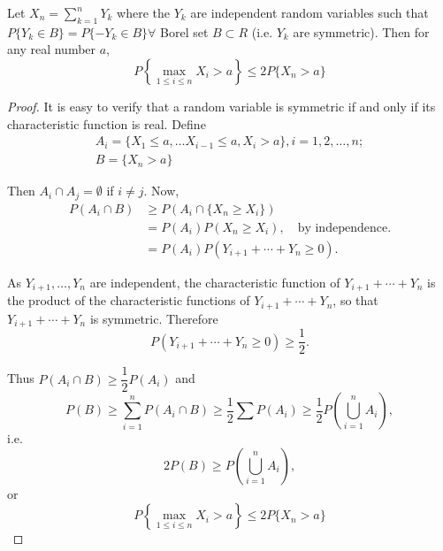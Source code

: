 \setcounter{lemma}{0}
\begin{lemma}\label{chap7-lem1}
Let $X_{n}=\sum\limits^{n}_{k=1}Y_{k}$ where the $Y_{k}$ are
independent random variables such that $P\{Y_{k}\in B\}=P\{-Y_{k}\in
B\}\forall$ Borel set $B\subset R$ (i.e. $Y_{k}$ are symmetric). Then
for any real number $a$,
$$
P\left\{\max\limits_{1\leq i\leq n} X_{i}>a\right\}\leq 2P\{X_{n}>a\}
$$
\end{lemma}

\begin{proof}
It is easy to verify that a random variable is symmetric if and only
if its characteristic function is real. Define
\begin{gather*}
A_{i}=\{X_{1}\leq a,\ldots X_{i-1}\leq a, X_{i}>a\},i=1,2,\ldots,n;\\
B=\{X_{n}>a\}
\end{gather*}

Then $A_{i}\cap A_{j}=\emptyset$ if $i\neq j$. Now,
\begin{align*}
P(A_{i}\cap B) &\geq P(A_{i}\cap \{X_{n}\geq X_{i}\})\\
&= P(A_{i})P(X_{n}\geq X_{i}),\quad\text{by independence.}\\
&= P(A_{i})P(Y_{i+1}+\cdots+Y_{n}\geq 0).
\end{align*}

As $Y_{i+1},\ldots,Y_{n}$ are independent, the characteristic function
of $Y_{i+1}+\cdots+Y_{n}$ is the product of the characteristic
functions of $Y_{i+1}+\cdots+Y_{n}$, so that $Y_{i+1}+\cdots+Y_{n}$ is
symmetric. Therefore
$$
P(Y_{i+1}+\cdots+Y_{n}\geq 0)\geq \frac{1}{2}.
$$

Thus $P(A_{i}\cap B)\geq \dfrac{1}{2}P(A_{i})$ and
$$
P(B)\geq \sum\limits^{n}_{i=1}P(A_{i}\cap B)\geq \frac{1}{2}\sum
P(A_{i})\geq \frac{1}{2}P\left(\bigcup\limits^{n}_{i=1}A_{i}\right),
$$
i.e.\pageoriginale
$$
2P(B)\geq P\left(\bigcup\limits^{n}_{i=1}A_{i}\right),
$$
or
$$
P\left\{\max\limits_{1\leq i\leq n}X_{i}>a\right\}\leq 2P\{X_{n}>a\}
$$
\end{proof}

